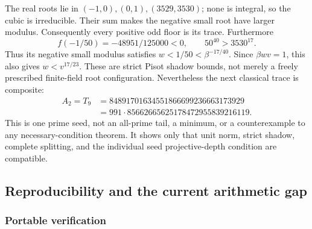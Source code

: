 \documentclass[11pt,a4paper]{article}
\theoremstyle{definition}\newtheorem{definition}[theorem]{Definition}
\theoremstyle{remark}\newtheorem{remark}[theorem]{Remark}
\begin{document}
The real roots lie in $(-1,0),(0,1),(3529,3530)$; none is integral,
so the cubic is irreducible. Their sum makes the negative small root
have larger modulus. Consequently every positive odd floor is its trace.
Furthermore
\[
 f(-1/50)=-48951/125000<0,\qquad50^{40}>3530^{17}.
\]
Thus its negative small modulus satisfies
$w<1/50<\beta^{-17/40}$. Since $\beta wv=1$, this also gives
$w<v^{17/23}$. These are strict Pisot shadow bounds, not merely a
freely prescribed finite-field root configuration.
Nevertheless the next classical trace is composite:
\[
 \begin{split}
 A_2=T_9&=84891701634551866699236663173929\\
       &=991\cdot85662665625178472955839216119.
 \end{split}
\]
This is one prime seed, not an all-prime tail, a minimum, or a
counterexample to any necessary-condition theorem. It shows only that
unit norm, strict shadow, complete splitting, and the individual seed
projective-depth condition are compatible.


\subsection{Reproducibility and the current arithmetic gap}

\subsubsection{Portable verification}
\end{document}
